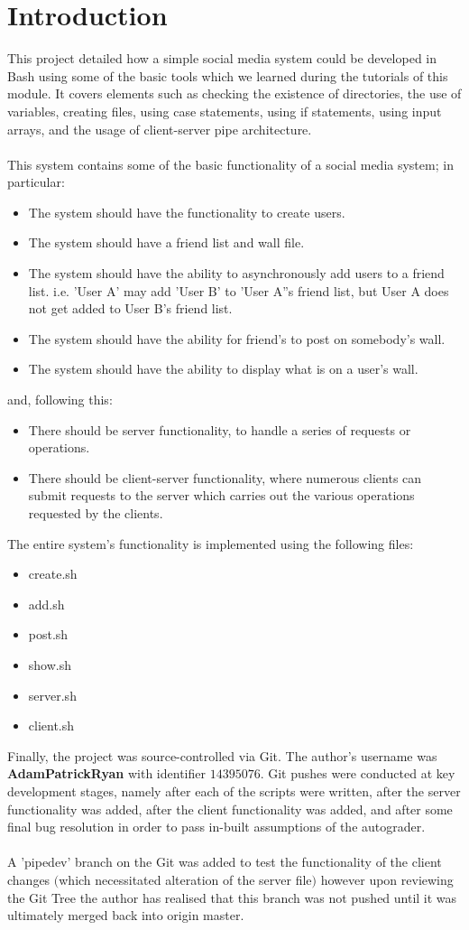 \documentclass[11pt]{article}
\theoremstyle{plain}
\theoremstyle{definition}
\begin{document}
\section{Introduction}\label{section:Introduction}
This project detailed how a simple social media system could be developed in Bash using some of the basic tools which we learned during the tutorials of this module. It covers elements such as checking the existence of directories, the use of variables, creating files, using case statements, using if statements, using input arrays, and the usage of client-server pipe architecture.\\
\\
This system contains some of the basic functionality of a social media system; in particular:
\begin{itemize}
	\item The system should have the functionality to create users.
	\item The system should have a friend list and wall file.
	\item The system should have the ability to asynchronously add users to a friend list. i.e. 'User A' may add 'User B' to 'User A''s friend list, but User A does not get added to User B's friend list.
	\item The system should have the ability for friend's to post on somebody's wall.
	\item The system should have the ability to display what is on a user's wall.
\end{itemize}
and, following this:
\begin{itemize}
	\item There should be server functionality, to handle a series of requests or operations.
	\item There should be client-server functionality, where numerous clients can submit requests to the server which carries out the various operations requested by the clients.
\end{itemize}
The entire system's functionality is implemented using the following files:
\begin{itemize}
	\item create.sh
	\item add.sh
	\item post.sh
	\item show.sh
	\item server.sh
	\item client.sh
\end{itemize}
Finally, the project was source-controlled via Git. The author's username was \textbf{AdamPatrickRyan} with identifier \textbf{$14395076$}. Git pushes were conducted at key development stages, namely after each of the scripts were written, after the server functionality was added, after the client functionality was added, and after some final bug resolution in order to pass in-built assumptions of the autograder.\\
\\
A 'pipedev' branch on the Git was added to test the functionality of the client changes $($which necessitated alteration of the server file$)$ however upon reviewing the Git Tree the author has realised that this branch was not pushed until it was ultimately merged back into origin master.
\pagebreak
\end{document}
